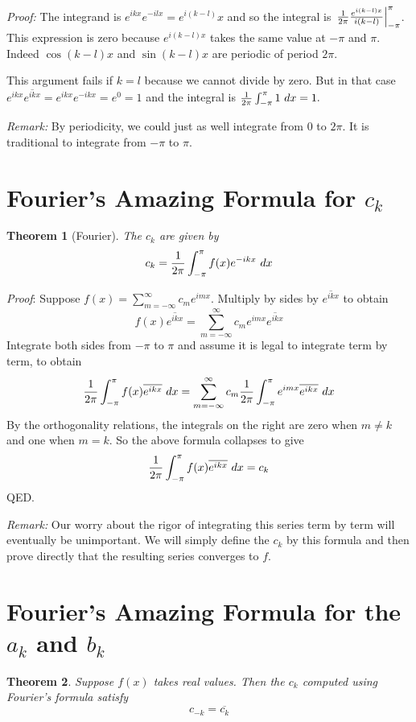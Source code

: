 \documentclass[11pt, oneside]{article}   	%
\newtheorem{theorem}{Theorem}
\begin{document}
{\em Proof:} The integrand is $e^{ikx}e^{-ilx} = e^{i(k -l)}x$ and so  the integral is $\left.{1 \over {2 \pi}} {{e^{i(k -l)x}} \over {i(k -l)}} \right|_{-\pi}^\pi$. This expression is zero because $e^{i(k -l)x}$ takes the same value at $-\pi$ and $\pi$. Indeed $\cos (k - l) x$ and $\sin (k - l)x$ are periodic of period $2 \pi$.

This argument fails if $k = l$ because we cannot divide by zero. But in that case $e^{ikx} \overline{e^{ikx}} = e^{ikx} e^{-ikx} = e^0 = 1$ and the integral is ${1 \over {2 \pi}} \int_{- \pi}^\pi 1 \ dx = 1.$

{\em Remark:} By periodicity, we could just as well integrate from $0$ to $2 \pi$. It is traditional to integrate from $-\pi$ to $\pi$.

\section{Fourier's Amazing Formula for $c_k$}

\begin{theorem}[Fourier]
The $c_k$ are given by
\[c_k = {1 \over {2 \pi}} \int_{- \pi}^\pi f(x) e^{- i k x} \ dx\]
\end{theorem}

{\em Proof}: Suppose $f(x) = \sum_{m = - \infty}^\infty c_m e^{imx}$. Multiply by sides by $\overline{e^{i k x}}$ to obtain
\[f(x) \overline{e^{ikx}} = \sum_{m = - \infty}^\infty c_m e^{imx} \overline{e^{ikx}}\]
Integrate both sides from $- \pi$ to $\pi$ and assume it is legal to integrate term by term, to obtain
\[{1 \over {2 \pi}} \int_{- \pi}^\pi f(x) \overline{e^{ikx}} \ dx = \sum_{m = - \infty}^\infty c_m {1 \over {2 \pi}} \int_{- \pi}^\pi e^{i m x} \overline{e^{ikx}}\ dx\]
 By the orthogonality relations, the integrals on the right are zero when $m \ne k$ and one when $m = k$. So the above formula collapses to give
 \[{1 \over {2 \pi}} \int_{- \pi}^\pi f(x) \overline{e^{ikx}} \ dx = c_k\]
 QED.
 
 {\em Remark:} Our worry about the rigor of integrating this series term by term will eventually be unimportant. We will simply define the $c_k$ by this formula and then prove directly that the resulting series converges to $f$.
  
 \section{Fourier's Amazing Formula for the $a_k$ and $b_k$}
 
 \begin{theorem}
 Suppose $f(x)$ takes real values. Then the $c_k$ computed using Fourier's formula satisfy
 $$c_{-k} = \overline{c_k}$$
\end{theorem}
\end{document}
